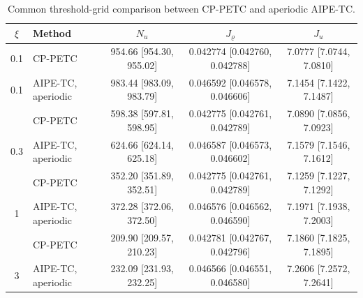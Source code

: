 \begin{table}[t]
\centering
\caption{Common threshold-grid comparison between CP-PETC and aperiodic AIPE-TC.}
\label{tab:threshold_grid_final}
\scriptsize
\renewcommand{\arraystretch}{1.15}
\begin{tabular}{c l c c c}
\toprule
$\xi$ & Method & $N_u$ & $J_\varrho$ & $J_u$ \\
\midrule
0.1 & CP-PETC & 954.66 [954.30, 955.02] & 0.042774 [0.042760, 0.042788] & 7.0777 [7.0744, 7.0810] \\
0.1 & AIPE-TC, aperiodic & 983.44 [983.09, 983.79] & 0.046592 [0.046578, 0.046606] & 7.1454 [7.1422, 7.1487] \\
\addlinespace[1pt]
0.3 & CP-PETC & 598.38 [597.81, 598.95] & 0.042775 [0.042761, 0.042789] & 7.0890 [7.0856, 7.0923] \\
0.3 & AIPE-TC, aperiodic & 624.66 [624.14, 625.18] & 0.046587 [0.046573, 0.046602] & 7.1579 [7.1546, 7.1612] \\
\addlinespace[1pt]
1 & CP-PETC & 352.20 [351.89, 352.51] & 0.042775 [0.042761, 0.042789] & 7.1259 [7.1227, 7.1292] \\
1 & AIPE-TC, aperiodic & 372.28 [372.06, 372.50] & 0.046576 [0.046562, 0.046590] & 7.1971 [7.1938, 7.2003] \\
\addlinespace[1pt]
3 & CP-PETC & 209.90 [209.57, 210.23] & 0.042781 [0.042767, 0.042796] & 7.1860 [7.1825, 7.1895] \\
3 & AIPE-TC, aperiodic & 232.09 [231.93, 232.25] & 0.046566 [0.046551, 0.046580] & 7.2606 [7.2572, 7.2641] \\
\bottomrule
\end{tabular}
\end{table}
